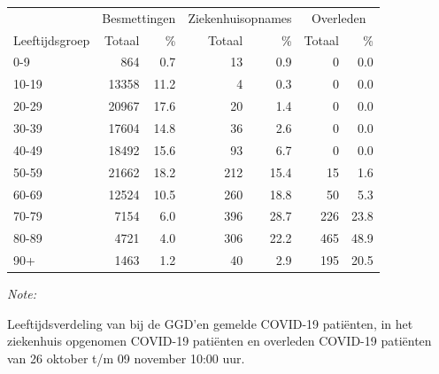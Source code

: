 \documentclass[
  english,
  man,floatsintext]{apa6}
\begin{document}
\begin{table}[H]
\centering\begingroup\fontsize{11}{13}\selectfont

\begin{threeparttable}
\begin{tabular}{lrrrrrr}
\toprule
\multicolumn{1}{c}{ } & \multicolumn{2}{c}{Besmettingen} & \multicolumn{2}{c}{Ziekenhuisopnames} & \multicolumn{2}{c}{Overleden} \\
\cmidrule(l{3pt}r{3pt}){2-3} \cmidrule(l{3pt}r{3pt}){4-5} \cmidrule(l{3pt}r{3pt}){6-7}
Leeftijdsgroep & Totaal & \% & Totaal & \% & Totaal & \%\\
\midrule
0-9 & 864 & 0.7 & 13 & 0.9 & 0 & 0.0\\
10-19 & 13358 & 11.2 & 4 & 0.3 & 0 & 0.0\\
20-29 & 20967 & 17.6 & 20 & 1.4 & 0 & 0.0\\
30-39 & 17604 & 14.8 & 36 & 2.6 & 0 & 0.0\\
40-49 & 18492 & 15.6 & 93 & 6.7 & 0 & 0.0\\
50-59 & 21662 & 18.2 & 212 & 15.4 & 15 & 1.6\\
60-69 & 12524 & 10.5 & 260 & 18.8 & 50 & 5.3\\
70-79 & 7154 & 6.0 & 396 & 28.7 & 226 & 23.8\\
80-89 & 4721 & 4.0 & 306 & 22.2 & 465 & 48.9\\
90+ & 1463 & 1.2 & 40 & 2.9 & 195 & 20.5\\
\bottomrule
\end{tabular}
\begin{tablenotes}
\item \textit{Note: } 
\item Leeftijdsverdeling van bij de GGD’en gemelde COVID-19 patiënten, in het ziekenhuis opgenomen COVID-19 patiënten en overleden COVID-19 patiënten van 26 oktober t/m 09 november 10:00 uur.
\end{tablenotes}
\end{threeparttable}
\endgroup{}
\end{table}
\end{document}
